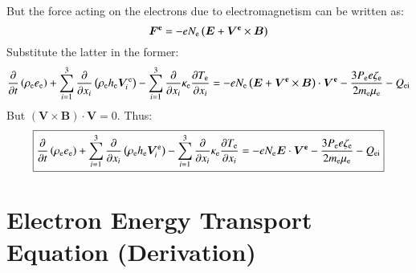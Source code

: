 \documentclass{warpdoc}
\newcommand\frameeqn[1]{\fbox{$\displaystyle #1$}}
\renewcommand{\vec}[1]{\bm{#1}}
\begin{document}
%
But the force acting on the electrons due to electromagnetism can be written as:
%
\begin{equation}
  \vec{F^{\rm e}} = -eN_{\rm e}\left(\vec{E} + \vec{V^{\rm e}} \times \vec{B}\right)
\end{equation}
%
Substitute the latter in the former:
%
\begin{equation}
  \frac{\partial }{\partial t} \left( \rho_{\rm e} e_{\rm e} \right)
  + \sum_{i=1}^3 \frac{\partial }{\partial x_i} \left(\rho_{\rm e} h_{\rm e} \vec{V}_i^{\rm e} \right)
  - \sum_{i=1}^3 \frac{\partial }{\partial x_i} \kappa_{\rm e} \frac{\partial T_{\rm e}}{\partial x_i}
  =
 - e N_{\rm e}\left(\vec{E} + \vec{V^{\rm e}} \times \vec{B}\right) \cdot \vec{V^{\rm e}}
 -    \frac{3 P_{\rm e}  e \zeta_{\rm e}}{2 m_{\rm e}\mu_{\rm e}} - Q_{\rm ei}  
 \end{equation}
%
But $(\vec{V}\times\vec{B})\cdot\vec{V}=0$. Thus:
%
\begin{equation}
\frameeqn{
  \frac{\partial }{\partial t} \left( \rho_{\rm e} e_{\rm e} \right)
  + \sum_{i=1}^3 \frac{\partial }{\partial x_i} \left(\rho_{\rm e} h_{\rm e} \vec{V}_i^{\rm e} \right)
  - \sum_{i=1}^3 \frac{\partial }{\partial x_i} \kappa_{\rm e} \frac{\partial T_{\rm e}}{\partial x_i}
  =
 - e N_{\rm e} \vec{E} \cdot \vec{V^{\rm e}}
 -    \frac{3 P_{\rm e}  e \zeta_{\rm e}}{2 m_{\rm e}\mu_{\rm e}} - Q_{\rm ei}  
}
\label{eqn:eenergy_raizer}
 \end{equation}
%




\section{Electron Energy Transport Equation (Derivation)}
\end{document}
